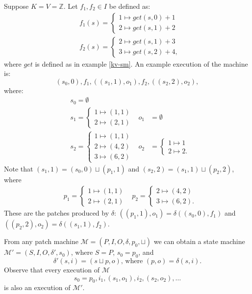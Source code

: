 \documentclass[12pt,a4paper,en]{pracamgr}
\newcommand{\mc}[1]{\mathcal{#1}}
\newcommand{\mbb}[1]{\mathbb{#1}}
\begin{document}
\begin{ex}
    Suppose $K = V = \mbb Z$. Let $f_1, f_2 \in I$ be defined as:
    \begin{align*}
        & f_1(s) = \begin{cases} 1 \mapsto get(s, 0) + 1\\ 2 \mapsto get(s, 1) + 2 \end{cases}\\
        & f_2(s) = \begin{cases} 2 \mapsto get(s, 1) + 3\\ 3 \mapsto get(s, 2) + 4, \end{cases}
    \end{align*}
    where $get$ is defined as in example \ref{kv-sm}. An example execution of the machine is:
    $$ (s_0, 0), f_1, ((s_1, 1), o_1), f_2, ((s_2, 2), o_2), $$
    where:
    \begin{align*}
        & s_0 = \emptyset\\
        & s_1 = \begin{cases} 1 \mapsto (1, 1) \\ 2 \mapsto (2, 1) \end{cases}
            & o_1 &= \emptyset\\
        & s_2 = \begin{cases} 1 \mapsto (1, 1) \\ 2 \mapsto (4, 2) \\ 3 \mapsto (6, 2) \end{cases}
            & o_2 &= \begin{cases} 1 \mapsto 1 \\ 2 \mapsto 2. \end{cases}
    \end{align*}
    Note that $(s_1, 1) = (s_0, 0) \sqcup (p_1, 1)$ and $(s_2, 2) = (s_1, 1) \sqcup (p_2, 2)$, where
    \begin{align*}
        & p_1 = \begin{cases} 1 \mapsto (1, 1) \\ 2 \mapsto (2, 1) \end{cases}
        & p_2 = \begin{cases} 2 \mapsto (4, 2) \\ 3 \mapsto (6, 2). \end{cases}
    \end{align*}
    These are the patches produced by $\delta$: $((p_1, 1), o_1) = \delta((s_0, 0), f_1)$ and $((p_2, 2), o_2) = \delta((s_1, 1), f_2)$.
\end{ex}

From any patch machine $\mc M = (P, I, O, \delta, p_0, \sqcup)$ we can obtain a state machine $\mc M' = (S, I, O, \delta', s_0)$, where $S = P$, $s_0 = p_0$, and
$$ \delta'(s, i) = (s \sqcup p, o)\text{, where } (p, o) = \delta(s, i). $$
Observe that every execution of $\mc M$
$$ s_0 = p_0, i_1, (s_1, o_1), i_2, (s_2, o_2), \dots $$
is also an execution of $\mc M'$.
\end{document}
